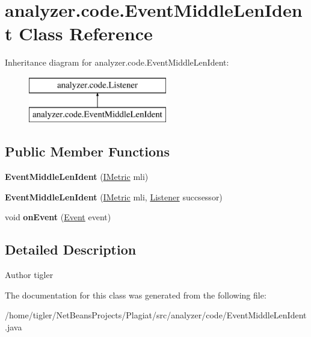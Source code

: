 \hypertarget{classanalyzer_1_1code_1_1EventMiddleLenIdent}{}\section{analyzer.\+code.\+Event\+Middle\+Len\+Ident Class Reference}
\label{classanalyzer_1_1code_1_1EventMiddleLenIdent}
Inheritance diagram for analyzer.\+code.\+Event\+Middle\+Len\+Ident\+:\begin{figure}[H]
\begin{center}
\leavevmode
\includegraphics[height=2.000000cm]{classanalyzer_1_1code_1_1EventMiddleLenIdent}
\end{center}
\end{figure}
\subsection*{Public Member Functions}
\begin{DoxyCompactItemize}
\item 
\mbox{\label{classanalyzer_1_1code_1_1EventMiddleLenIdent_a995a9b0ac22753aa10ca5abebca442dc}} 
{\bfseries Event\+Middle\+Len\+Ident} (\hyperlink{interfaceanalyzer_1_1code_1_1IMetric}{I\+Metric} mli)
\item 
\mbox{\label{classanalyzer_1_1code_1_1EventMiddleLenIdent_a3f84d2a99cdee3688fef3c42cb613bbc}} 
{\bfseries Event\+Middle\+Len\+Ident} (\hyperlink{interfaceanalyzer_1_1code_1_1IMetric}{I\+Metric} mli, \hyperlink{classanalyzer_1_1code_1_1Listener}{Listener} succsessor)
\item 
\mbox{\label{classanalyzer_1_1code_1_1EventMiddleLenIdent_ad5c28b67f1dac29d4cbda885cb54ce92}} 
void {\bfseries on\+Event} (\hyperlink{classanalyzer_1_1code_1_1Event}{Event} event)
\end{DoxyCompactItemize}


\subsection{Detailed Description}
\begin{DoxyAuthor}{Author}
tigler 
\end{DoxyAuthor}


The documentation for this class was generated from the following file\+:\begin{DoxyCompactItemize}
\item 
/home/tigler/\+Net\+Beans\+Projects/\+Plagiat/src/analyzer/code/Event\+Middle\+Len\+Ident.\+java\end{DoxyCompactItemize}
